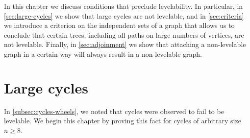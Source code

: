 \label{ch:non-levelable-results}

In this chapter we discuss conditions that preclude levelability. In particular, in \autoref{sec:large-cycles} we show that large cycles are not levelable, and in \autoref{sec:criteria} we introduce a criterion on the independent sets of a graph that allows us to conclude that certain trees, including all paths on large numbers of vertices, are not levelable. Finally, in \autoref{sec:adjoinment} we show that attaching a non-levelable graph in a certain way will always result in a non-levelable graph.

\section{Large cycles} \label{sec:large-cycles}

In \autoref{subsec:cycles-wheels}, we noted that cycles were observed to fail to be levelable. We begin this chapter by proving this fact for cycles of arbitrary size $n \geq 8.$

